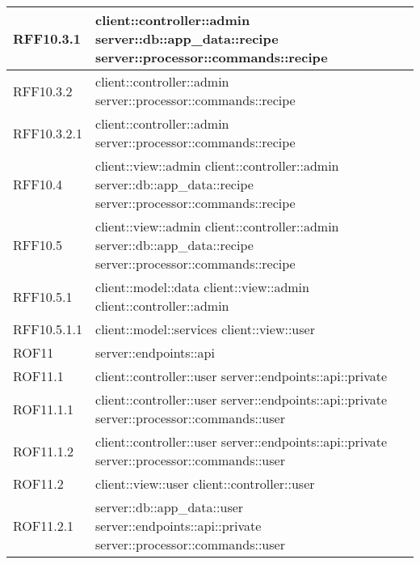 \begin{center}
\begin{longtable}{| p{4cm} | p{8cm} |}
\hline
RFF10.3.1 & client::controller::admin \newline server::db::app\_data::recipe \newline server::processor::commands::recipe \\
\hline
RFF10.3.2 & client::controller::admin \newline server::processor::commands::recipe \\
\hline
RFF10.3.2.1 & client::controller::admin \newline server::processor::commands::recipe \\
\hline
RFF10.4 & client::view::admin \newline client::controller::admin \newline server::db::app\_data::recipe \newline server::processor::commands::recipe \\
\hline
RFF10.5 & client::view::admin \newline client::controller::admin \newline server::db::app\_data::recipe \newline server::processor::commands::recipe \\
\hline
RFF10.5.1 & client::model::data \newline client::view::admin \newline client::controller::admin \\
\hline
RFF10.5.1.1 & client::model::services \newline client::view::user \\
\hline
ROF11 & server::endpoints::api \\
\hline
ROF11.1 & client::controller::user \newline server::endpoints::api::private \\
\hline
ROF11.1.1 & client::controller::user \newline server::endpoints::api::private \newline server::processor::commands::user \\
\hline
ROF11.1.2 & client::controller::user \newline server::endpoints::api::private \newline server::processor::commands::user \\
\hline
ROF11.2 & client::view::user \newline client::controller::user \\
\hline
ROF11.2.1 & server::db::app\_data::user \newline server::endpoints::api::private \newline server::processor::commands::user \\

\end{longtable}
\end{center}
